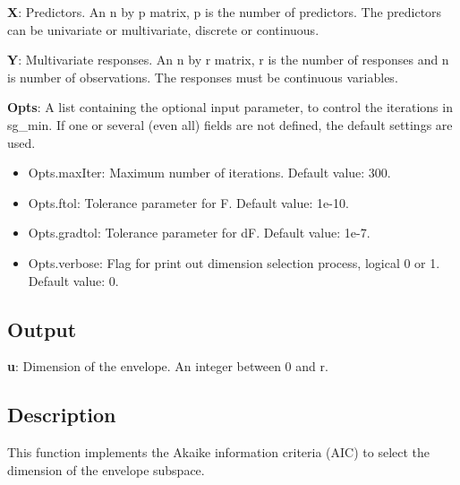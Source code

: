 \documentclass[a4paper,11pt,openany]{memoir}
\begin{document}
\begin{par}
\textbf{X}: Predictors. An n by p matrix, p is the number of predictors. The predictors can be univariate or multivariate, discrete or continuous.
\end{par} \vspace{1em}
\begin{par}
\textbf{Y}: Multivariate responses. An n by r matrix, r is the number of responses and n is number of observations. The responses must be continuous variables.
\end{par} \vspace{1em}
\begin{par}
\textbf{Opts}: A list containing the optional input parameter, to control the iterations in sg\_min. If one or several (even all) fields are not defined, the default settings are used.
\end{par} \vspace{1em}
\begin{itemize}
\setlength{\itemsep}{-1ex}
   \item Opts.maxIter: Maximum number of iterations.  Default value: 300.
   \item Opts.ftol: Tolerance parameter for F.  Default value: 1e-10.
   \item Opts.gradtol: Tolerance parameter for dF.  Default value: 1e-7.
   \item Opts.verbose: Flag for print out dimension selection process, logical 0 or 1. Default value: 0.
\end{itemize}


\subsection*{Output}

\begin{par}
\textbf{u}: Dimension of the envelope. An integer between 0 and r.
\end{par} \vspace{1em}


\subsection*{Description}

\begin{par}
This function implements the Akaike information criteria (AIC) to select the dimension of the envelope subspace.
\end{par} \vspace{1em}
\end{document}
